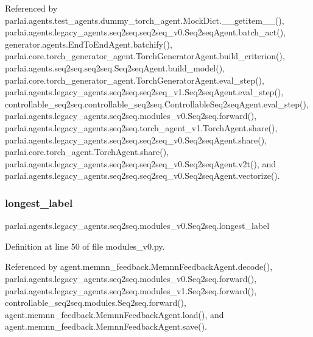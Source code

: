 Referenced by parlai.\+agents.\+test\+\_\+agents.\+dummy\+\_\+torch\+\_\+agent.\+Mock\+Dict.\+\_\+\+\_\+getitem\+\_\+\+\_\+(), parlai.\+agents.\+legacy\+\_\+agents.\+seq2seq.\+seq2seq\+\_\+v0.\+Seq2seq\+Agent.\+batch\+\_\+act(), generator.\+agents.\+End\+To\+End\+Agent.\+batchify(), parlai.\+core.\+torch\+\_\+generator\+\_\+agent.\+Torch\+Generator\+Agent.\+build\+\_\+criterion(), parlai.\+agents.\+seq2seq.\+seq2seq.\+Seq2seq\+Agent.\+build\+\_\+model(), parlai.\+core.\+torch\+\_\+generator\+\_\+agent.\+Torch\+Generator\+Agent.\+eval\+\_\+step(), parlai.\+agents.\+legacy\+\_\+agents.\+seq2seq.\+seq2seq\+\_\+v1.\+Seq2seq\+Agent.\+eval\+\_\+step(), controllable\+\_\+seq2seq.\+controllable\+\_\+seq2seq.\+Controllable\+Seq2seq\+Agent.\+eval\+\_\+step(), parlai.\+agents.\+legacy\+\_\+agents.\+seq2seq.\+modules\+\_\+v0.\+Seq2seq.\+forward(), parlai.\+agents.\+legacy\+\_\+agents.\+seq2seq.\+torch\+\_\+agent\+\_\+v1.\+Torch\+Agent.\+share(), parlai.\+agents.\+legacy\+\_\+agents.\+seq2seq.\+seq2seq\+\_\+v0.\+Seq2seq\+Agent.\+share(), parlai.\+core.\+torch\+\_\+agent.\+Torch\+Agent.\+share(), parlai.\+agents.\+legacy\+\_\+agents.\+seq2seq.\+seq2seq\+\_\+v0.\+Seq2seq\+Agent.\+v2t(), and parlai.\+agents.\+legacy\+\_\+agents.\+seq2seq.\+seq2seq\+\_\+v0.\+Seq2seq\+Agent.\+vectorize().

\mbox{\label{classparlai_1_1agents_1_1legacy__agents_1_1seq2seq_1_1modules__v0_1_1Seq2seq_af2d1dd10d9adf8062267fb8b61920296}} 
\subsubsection{\texorpdfstring{longest\+\_\+label}{longest\_label}}
{\footnotesize\ttfamily parlai.\+agents.\+legacy\+\_\+agents.\+seq2seq.\+modules\+\_\+v0.\+Seq2seq.\+longest\+\_\+label}



Definition at line 50 of file modules\+\_\+v0.\+py.



Referenced by agent.\+memnn\+\_\+feedback.\+Memnn\+Feedback\+Agent.\+decode(), parlai.\+agents.\+legacy\+\_\+agents.\+seq2seq.\+modules\+\_\+v0.\+Seq2seq.\+forward(), parlai.\+agents.\+legacy\+\_\+agents.\+seq2seq.\+modules\+\_\+v1.\+Seq2seq.\+forward(), controllable\+\_\+seq2seq.\+modules.\+Seq2seq.\+forward(), agent.\+memnn\+\_\+feedback.\+Memnn\+Feedback\+Agent.\+load(), and agent.\+memnn\+\_\+feedback.\+Memnn\+Feedback\+Agent.\+save().


